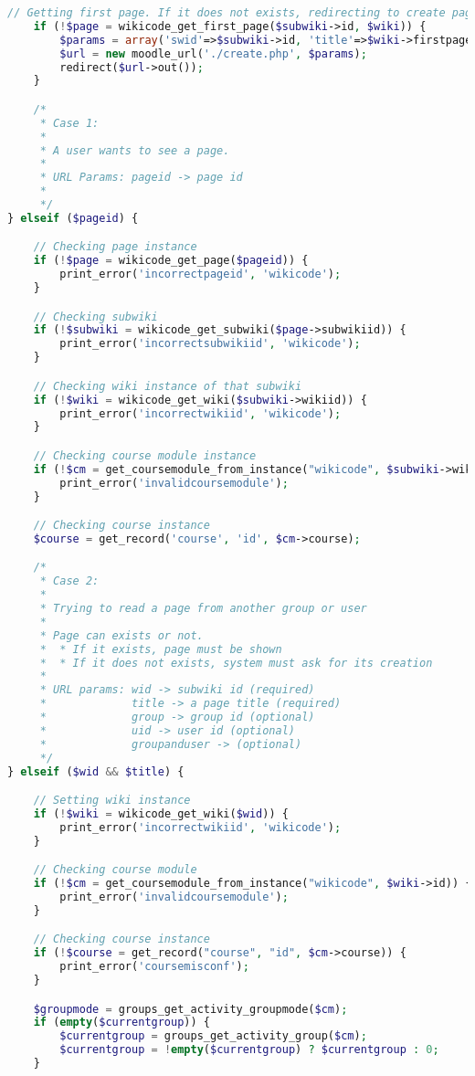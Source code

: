 \begin{lstlisting}[language=PHP]
    // Getting first page. If it does not exists, redirecting to create page
    if (!$page = wikicode_get_first_page($subwiki->id, $wiki)) {
        $params = array('swid'=>$subwiki->id, 'title'=>$wiki->firstpagetitle);
        $url = new moodle_url('./create.php', $params);
        redirect($url->out());
    }

    /*
     * Case 1:
     *
     * A user wants to see a page.
     *
     * URL Params: pageid -> page id
     *
     */
} elseif ($pageid) {

    // Checking page instance
    if (!$page = wikicode_get_page($pageid)) {
        print_error('incorrectpageid', 'wikicode');
    }

    // Checking subwiki
    if (!$subwiki = wikicode_get_subwiki($page->subwikiid)) {
        print_error('incorrectsubwikiid', 'wikicode');
    }

    // Checking wiki instance of that subwiki
    if (!$wiki = wikicode_get_wiki($subwiki->wikiid)) {
        print_error('incorrectwikiid', 'wikicode');
    }

    // Checking course module instance
    if (!$cm = get_coursemodule_from_instance("wikicode", $subwiki->wikiid)) {
        print_error('invalidcoursemodule');
    }

    // Checking course instance
    $course = get_record('course', 'id', $cm->course);

    /*
     * Case 2:
     *
     * Trying to read a page from another group or user
     *
     * Page can exists or not.
     *  * If it exists, page must be shown
     *  * If it does not exists, system must ask for its creation
     *
     * URL params: wid -> subwiki id (required)
     *             title -> a page title (required)
     *             group -> group id (optional)
     *             uid -> user id (optional)
     *             groupanduser -> (optional)
     */
} elseif ($wid && $title) {

    // Setting wiki instance
    if (!$wiki = wikicode_get_wiki($wid)) {
        print_error('incorrectwikiid', 'wikicode');
    }

    // Checking course module
    if (!$cm = get_coursemodule_from_instance("wikicode", $wiki->id)) {
        print_error('invalidcoursemodule');
    }

    // Checking course instance
    if (!$course = get_record("course", "id", $cm->course)) {
        print_error('coursemisconf');
    }

    $groupmode = groups_get_activity_groupmode($cm);
    if (empty($currentgroup)) {
        $currentgroup = groups_get_activity_group($cm);
        $currentgroup = !empty($currentgroup) ? $currentgroup : 0;
    }


\end{lstlisting}
